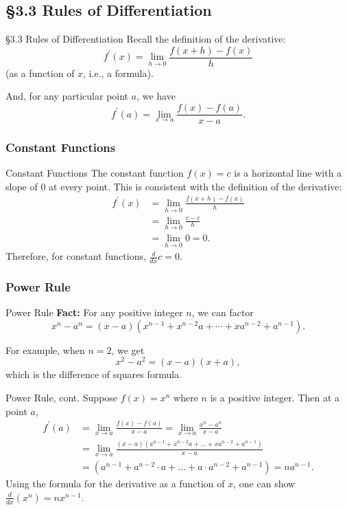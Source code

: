 \documentclass[cal1spr16Lectures.tex]{subfiles}
\begin{document}
\subsection[3.3 Rules of Differentiation]{\S 3.3 Rules of Differentiation}

\begin{frame}{\S 3.3 Rules of Differentiation}
Recall the definition of the derivative:
\[f^{\prime}(x)=\lim_{h \to 0} \frac{f(x+h)-f(x)}{h}\]
(as a function of $x$, i.e., a formula).

And, for any particular point $a$, we have 
\[f^{\prime}(a)=\lim_{x \to a} \frac{f(x)-f(a)}{x-a}.\]
\end{frame}

\subsubsection{Constant Functions}

\begin{frame}{\small Constant Functions}\footnotesize
The constant function $f(x)=c$ is a horizontal line with a slope of 0 at every point.  This is consistent with the definition of the derivative:
\begin{align*}
f^{\prime}(x)&=\lim_{h \to 0} \frac{f(x+h)-f(x)}{h} \\
 &=\lim_{h \to 0} \frac{c-c}{h} \\[0.5pc]
 &=\lim_{h \to 0} 0 = 0.
\end{align*}
Therefore, for constant functions, \alert{$\frac{d}{dx}c=0$}.
\end{frame}

\subsubsection{Power Rule}

\begin{frame}{\small Power Rule}{}
{\bf Fact:} For any positive integer $n$, we can factor
\[x^n-a^n=(x-a)(x^{n-1}+x^{n-2}a+\cdots+xa^{n-2}+a^{n-1}).\]

For example, when $n=2$, we get
\[x^2-a^2=(x-a)(x+a),\]
which is the difference of squares formula.
\end{frame}

\begin{frame}{\small Power Rule, cont.}\footnotesize
Suppose $f(x)=x^n$ where $n$ is a positive integer.  Then at a point $a$,
\begin{align*}
f^{\prime}(a) &= \lim_{x \to a} \frac{f(x)-f(a)}{x-a} = \lim_{x \to a} \frac{x^n - a^n}{x-a} \\[0.25pc]
&= \lim_{x \to a} \frac{(x-a)(x^{n-1}+x^{n-2}a + \dots + xa^{n-2}+a^{n-1})}{x-a} \\[0.25pc]
&= (a^{n-1}+a^{n-2}\cdot a + \dots + a \cdot a^{n-2} + a^{n-1}) = n a^{n-1}. 
\end{align*}
Using the formula for the derivative as a function of $x$, one can show \alert{$\frac{d}{dx} (x^n)= nx^{n-1}$}.
\end{frame}
\end{document}

